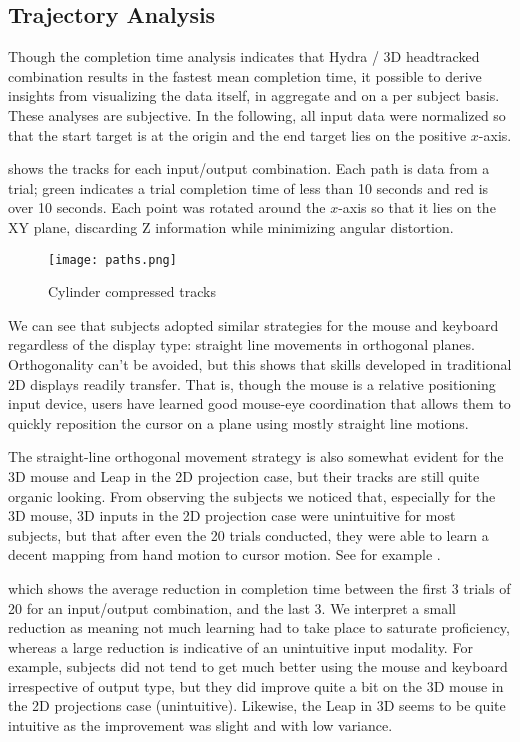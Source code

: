\subsection{Trajectory Analysis}\label{sec:trajectory}

Though the completion time analysis indicates that Hydra / 3D headtracked
combination results in the fastest mean completion time, it possible to derive
insights from visualizing the data itself, in aggregate and on a per subject
basis.  These analyses are subjective.  In the following, all input data were
normalized so that the start target is at the origin and the end target lies
on the positive $x$-axis.

 shows the tracks for each input/output
combination. Each path is data from a trial; green indicates a trial
completion time of less than 10 seconds and red is over 10 seconds.  Each
point was rotated around the $x$-axis so that it lies on the XY plane,
discarding Z information while minimizing angular distortion.

\begin{figure}
    \centering
    \texttt{[image: paths.png]}
    \caption{Cylinder compressed tracks}
    \label{fig:compressedtracks}
\end{figure}

We can see that subjects adopted similar strategies for the mouse and keyboard
regardless of the display type: straight line movements in orthogonal planes.
Orthogonality can't be avoided, but this shows that skills developed in
traditional 2D displays readily transfer.  That is, though the mouse is a
relative positioning input device, users have learned good mouse-eye
coordination that allows them to quickly reposition the cursor on a plane
using mostly straight line motions.

The straight-line orthogonal movement strategy is also somewhat evident for
the 3D mouse and Leap in the 2D projection case, but their tracks are still
quite organic looking.  From observing the subjects we noticed that,
especially for the 3D mouse, 3D inputs in the 2D projection case were
unintuitive for most subjects, but that after even the 20 trials conducted,
they were able to learn a decent mapping from hand motion to cursor motion.
See for example .

 which shows the average reduction in completion time
between the first 3 trials of 20 for an input/output combination, and the last
3.  We interpret a small reduction as meaning not much learning had to take
place to saturate proficiency, whereas a large reduction is indicative of an
unintuitive input modality.  For example, subjects did not tend to get much
better using the mouse and keyboard irrespective of output type, but they did
improve quite a bit on the 3D mouse in the 2D projections case (unintuitive).
Likewise, the Leap in 3D seems to be quite intuitive as the improvement was
slight and with low variance.

